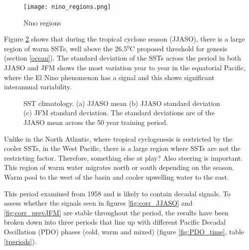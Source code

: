 \begin{figure} %
	\noindent\texttt{[image: nino\_regions.png]}
	\caption{Nino regions}\label{fig:nino}
\end{figure}

Figure \ref{fig:SST_JJASO} shows that during the tropical cyclone season (JJASO), there is a large region of warm SSTs, well above the 26.5$^0$C proposed threshold for genesis (section \ref{ocean}). The standard deviation of the SSTs across the period in both JJASO and JFM shows the most variation year to year in the equatorial Pacific, where the El Nino phenomenon has a signal and this shows significant interannual variability. %

\begin{figure} %
	
	\caption{SST climatology. (a) JJASO mean (b) JJASO standard deviation (c) JFM standard deviation. The standard deviations are of the JJASO mean across the 50 year training period.}\label{fig:SST_JJASO}
\end{figure}

Unlike in the North Atlantic, where tropical cyclogenesis is restricted by the cooler SSTs, in the West Pacific, there is a large region where SSTs are not the restricting factor. Therefore, something else at play? Also steering is important.
This region of warm water migrates north or south depending on the season. Warm pool to the west of the basin and cooler upwelling water to the east.

This period examined from 1958 and is likely to contain decadal signals. To assess whether the signals seen in figures \ref{fig:corr_JJASO} and \ref{fig:corr_prevJFM} are stable throughout the period, the results have been broken down into three periods that line up with different Pacific Decadal Oscillation (PDO) phases (cold, warm and mixed) (figure \ref{fig:PDO_time}, table \ref{tperiods}).



